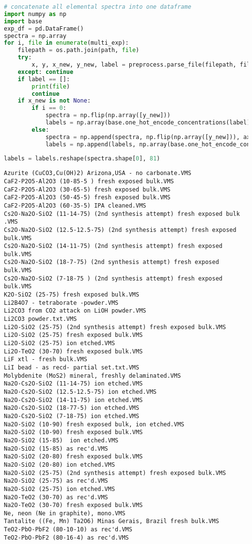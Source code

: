 \begin{lstlisting}[language=Python]
# concatenate all elemental spectra into one dataframe
import numpy as np
import base
exp_df = pd.DataFrame()
spectra = np.array
for i, file in enumerate(multi_exp):
    filepath = os.path.join(path, file)
    try:
        x, y, x_new, y_new, label = preprocess.parse_file(filepath, filetype='vms', scale=True, N_points=1024)
    except: continue
    if label == []: 
        print(file)
        continue
    if x_new is not None:
        if i == 0:
            spectra = np.flip(np.array([y_new]))
            labels = np.array(base.one_hot_encode_concentrations(label))
        else:
            spectra = np.append(spectra, np.flip(np.array([y_new])), axis=0)
            labels = np.append(labels, np.array(base.one_hot_encode_concentrations(label)), axis=0)
            
labels = labels.reshape(spectra.shape[0], 81)
\end{lstlisting}

\begin{lstlisting}
Azurite (CuCO3,Cu(OH)2) Arizona,USA - no carbonate.VMS
CaF2-P2O5-Al2O3 (10-85-5 ) fresh exposed bulk.VMS
CaF2-P2O5-Al2O3 (30-65-5) fresh exposed bulk.VMS
CaF2-P2O5-Al2O3 (50-45-5) fresh exposed bulk.VMS
CaF2-P2O5-Al2O3 (60-35-5) IPA cleaned.VMS
Cs2O-Na2O-SiO2 (11-14-75) (2nd synthesis attempt) fresh exposed bulk .VMS
Cs2O-Na2O-SiO2 (12.5-12.5-75) (2nd synthesis attempt) fresh exposed bulk.VMS
Cs2O-Na2O-SiO2 (14-11-75) (2nd synthesis attempt) fresh exposed bulk.VMS
Cs2O-Na2O-SiO2 (18-7-75) (2nd synthesis attempt) fresh exposed bulk.VMS
Cs2O-Na2O-SiO2 (7-18-75 ) (2nd synthesis attempt) fresh exposed bulk.VMS
K2O-SiO2 (25-75) fresh exposed bulk.VMS
Li2B4O7 - tetraborate -powder.VMS
Li2CO3 from CO2 attack on LiOH powder.VMS
Li2CO3 powder.txt.VMS
Li2O-SiO2 (25-75) (2nd synthesis attempt) fresh exposed bulk.VMS
Li2O-SiO2 (25-75) fresh exposed bulk.VMS
Li2O-SiO2 (25-75) ion etched.VMS
Li2O-TeO2 (30-70) fresh exposed bulk.VMS
LiF xtl - fresh bulk.VMS
LiI bead - as recd- partial set.txt.VMS
Molybdenite (MoS2) mineral, freshly delaminated.VMS
Na2O-Cs2O-SiO2 (11-14-75) ion etched.VMS
Na2O-Cs2O-SiO2 (12.5-12.5-75) ion etched.VMS
Na2O-Cs2O-SiO2 (14-11-75) ion etched.VMS
Na2O-Cs2O-SiO2 (18-77-5) ion etched.VMS
Na2O-Cs2O-SiO2 (7-18-75) ion etched.VMS
Na2O-SiO2 (10-90) fresh exposed bulk, ion etched.VMS
Na2O-SiO2 (10-90) fresh exposed bulk.VMS
Na2O-SiO2 (15-85)  ion etched.VMS
Na2O-SiO2 (15-85) as rec'd.VMS
Na2O-SiO2 (20-80) fresh exposed bulk.VMS
Na2O-SiO2 (20-80) ion etched.VMS
Na2O-SiO2 (25-75) (2nd synthesis attempt) fresh exposed bulk.VMS
Na2O-SiO2 (25-75) as rec'd.VMS
Na2O-SiO2 (25-75) ion etched.VMS
Na2O-TeO2 (30-70) as rec'd.VMS
Na2O-TeO2 (30-70) fresh exposed bulk.VMS
Ne, neon (Ne in graphite), mono.VMS
Tantalite ((Fe, Mn) Ta2O6) Minas Gerais, Brazil fresh bulk.VMS
TeO2-PbO-PbF2 (80-10-10) as rec'd.VMS
TeO2-PbO-PbF2 (80-16-4) as rec'd.VMS
\end{lstlisting}

